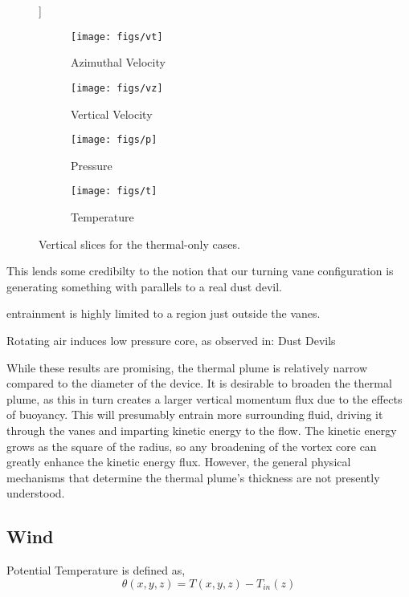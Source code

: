 \begin{figure}[htb]]
 \centering
 \begin{subfigure}{.5\textwidth}
  \centering
  \texttt{[image: figs/vt]}
  \caption{Azimuthal Velocity}
  \label{fig:vt-to}
 \end{subfigure}%
 \begin{subfigure}{.5\textwidth}
  \centering
  \texttt{[image: figs/vz]}
  \caption{Vertical Velocity}
  \label{fig:vz-to}
 \end{subfigure}

 \centering
 \begin{subfigure}{.5\textwidth}
  \centering
  \texttt{[image: figs/p]}
  \caption{Pressure}
  \label{fig:p-to}
 \end{subfigure}%
 \begin{subfigure}{.5\textwidth}
  \centering
  \texttt{[image: figs/t]}
  \caption{Temperature}
  \label{fig:t-to}
 \end{subfigure}
 \caption{Vertical slices for the thermal-only cases.}
 \label{fig:test}
\end{figure}



This lends some credibilty to the notion that our turning vane
configuration is generating something with parallels to a real dust
devil.  


entrainment is highly limited to a region just outside the vanes.

Rotating air induces low pressure core, as observed in:
Dust Devils

%
%
While these results are promising, the thermal plume is relatively
narrow compared to the diameter of the device. It is desirable to
broaden the thermal plume, as this in turn creates a larger vertical
momentum flux due to the effects of buoyancy. This will presumably
entrain more surrounding fluid, driving it through the vanes and
imparting kinetic energy to the flow. The kinetic energy grows as the
square of the radius, so any broadening of the vortex core can greatly
enhance the kinetic energy flux. However, the general physical
mechanisms that determine the thermal plume's thickness are not
presently understood. 

\subsection{Wind}

Potential Temperature is defined as,
\begin{equation}
  \theta(x,y,z) = T(x,y,z) -T_{in}(z) 
\end{equation}

